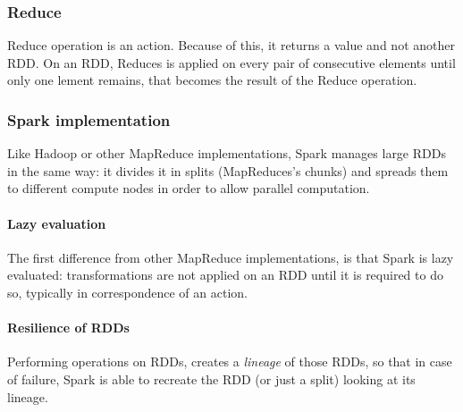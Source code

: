 \documentclass[\main/main.tex]{subfiles}
\begin{document}
\subsubsection{Reduce}
Reduce operation is an action. Because of this, it returns a value and not another RDD. On an RDD, Reduces is applied on every pair of consecutive elements until only one lement remains, that becomes the result of the Reduce operation.
\subsubsection{Spark implementation}
Like Hadoop or other MapReduce implementations, Spark manages large RDDs in the same way: it divides it in splits (MapReduces's chunks) and spreads them to different compute nodes in order to allow parallel computation.
\paragraph{Lazy evaluation}
The first difference from other MapReduce implementations, is that Spark is lazy evaluated: transformations are not applied on an RDD until it is required to do so, typically in correspondence of an action.
\paragraph{Resilience of RDDs}
Performing operations on RDDs, creates a \emph{lineage} of those RDDs, so that in case of failure, Spark is able to recreate the RDD (or just a split) looking at its lineage.
\newpage
\end{document}

